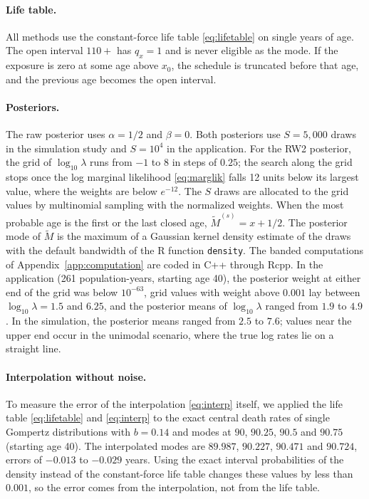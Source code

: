 \documentclass[12pt, letterpaper]{article}
\begin{document}
\paragraph{Life table.} All methods use the constant-force life table \eqref{eq:lifetable} on single years of age. The open interval $110+$ has $q_x = 1$ and is never eligible as the mode. If the exposure is zero at some age above $x_0$, the schedule is truncated before that age, and the previous age becomes the open interval.

\paragraph{Posteriors.} The raw posterior uses $\alpha = 1/2$ and $\beta = 0$. Both posteriors use $S = 5{,}000$ draws in the simulation study and $S = 10^4$ in the application. For the RW2 posterior, the grid of $\log_{10} \lambda$ runs from $-1$ to $8$ in steps of $0.25$; the search along the grid stops once the log marginal likelihood \eqref{eq:marglik} falls 12 units below its largest value, where the weights are below $e^{-12}$. The $S$ draws are allocated to the grid values by multinomial sampling with the normalized weights. When the most probable age is the first or the last closed age, $\tilde{M}^{(s)} = x + 1/2$. The posterior mode of $\tilde{M}$ is the maximum of a Gaussian kernel density estimate of the draws with the default bandwidth of the R function \texttt{density}. The banded computations of Appendix~\ref{app:computation} are coded in C++ through Rcpp. In the application (261 population-years, starting age 40), the posterior weight at either end of the grid was below $10^{-63}$, grid values with weight above $0.001$ lay between $\log_{10}\lambda = 1.5$ and $6.25$, and the posterior means of $\log_{10}\lambda$ ranged from $1.9$ to $4.9$. In the simulation, the posterior means ranged from $2.5$ to $7.6$; values near the upper end occur in the unimodal scenario, where the true log rates lie on a straight line.

\paragraph{Interpolation without noise.} To measure the error of the interpolation \eqref{eq:interp} itself, we applied the life table \eqref{eq:lifetable} and \eqref{eq:interp} to the exact central death rates of single Gompertz distributions with $b = 0.14$ and modes at $90$, $90.25$, $90.5$ and $90.75$ (starting age 40). The interpolated modes are $89.987$, $90.227$, $90.471$ and $90.724$, errors of $-0.013$ to $-0.029$ years. Using the exact interval probabilities of the density instead of the constant-force life table changes these values by less than $0.001$, so the error comes from the interpolation, not from the life table.
\end{document}
